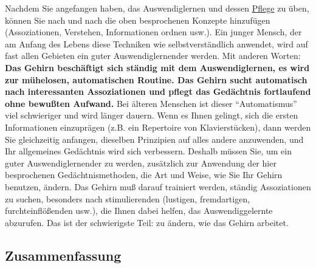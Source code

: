 Nachdem Sie angefangen haben, das Auswendiglernen und dessen \hyperlink{c1iii6k}{Pflege} zu üben, können Sie nach und nach die oben besprochenen Konzepte hinzufügen (Assoziationen, Verstehen, Informationen ordnen usw.).
Ein junger Mensch, der am Anfang des Lebens diese Techniken wie selbstverständlich anwendet, wird auf fast allen Gebieten ein guter Auswendiglernender werden.
Mit anderen Worten: \textbf{Das Gehirn beschäftigt sich ständig mit dem Auswendiglernen, es wird zur mühelosen, automatischen Routine.
Das Gehirn sucht automatisch nach interessanten Assoziationen und pflegt das Gedächtnis fortlaufend ohne bewußten Aufwand.}
Bei älteren Menschen ist dieser \enquote{Automatismus} viel schwieriger und wird länger dauern.
Wenn es Ihnen gelingt, sich die ersten Informationen einzuprägen (z.B. ein Repertoire von Klavierstücken), dann werden Sie gleichzeitig anfangen, dieselben Prinzipien auf alles andere anzuwenden, und Ihr allgemeines Gedächtnis wird sich verbessern.
Deshalb müssen Sie, um ein guter Auswendiglernender zu werden, zusätzlich zur Anwendung der hier besprochenen Gedächtnismethoden, die Art und Weise, wie Sie Ihr Gehirn benutzen, ändern.
Das Gehirn muß darauf trainiert werden, ständig Assoziationen zu suchen, besonders nach stimulierenden (lustigen, fremdartigen, furchteinflößenden usw.), die Ihnen dabei helfen, das Auswendiggelernte abzurufen.
Das ist der schwierigste Teil: zu ändern, wie das Gehirn arbeitet.


\subsection{Zusammenfassung}\hypertarget{c1iii6o}{} 

